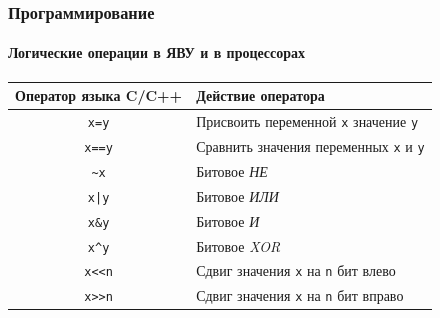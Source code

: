 \appendix

\begin{frame}[fragile]
    \frametitle{Программирование}
    \framesubtitle{Логические операции в ЯВУ и в процессорах}
    
    \begin{center}
        \begin{tabular}{c|l}
            \hline\hline
            Оператор языка C/C++ & Действие оператора\\
            \hline\hline
            \verb"x=y"  &Присвоить переменной \verb"x" значение \verb"y"\\
            \verb"x==y" &Сравнить значения переменных \verb"x" и \verb"y"\\
            \verb"~x"   &Битовое \emph{НЕ}\\
            \verb"x|y"  &Битовое \emph{ИЛИ}\\
            \verb"x&y"  &Битовое \emph{И}\\
            \verb"x^y"  &Битовое \emph{XOR}\\
            \verb"x<<n" &Сдвиг значения \verb"x" на \verb"n" бит влево\\
            \verb"x>>n" &Сдвиг значения \verb"x" на \verb"n" бит вправо\\
            \hline
        \end{tabular}
    \end{center}    
\end{frame}

